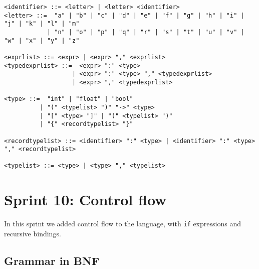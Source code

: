 \begin{verbatim}
<identifier> ::= <letter> | <letter> <identifier>
<letter> ::=  "a" | "b" | "c" | "d" | "e" | "f" | "g" | "h" | "i" | "j" | "k" | "l" | "m" 
            | "n" | "o" | "p" | "q" | "r" | "s" | "t" | "u" | "v" | "w" | "x" | "y" | "z"

<exprlist> ::= <expr> | <expr> "," <exprlist>
<typedexprlist> ::=  <expr> ":" <type> 
                   | <expr> ":" <type> "," <typedexprlist>
                   | <expr> "," <typedexprlist>
    
<type> ::=  "int" | "float" | "bool" 
          | "(" <typelist> ")" "->" <type> 
          | "[" <type> "]" | "(" <typelist> ")"
          | "{" <recordtypelist> "}"
          
<recordtypelist> ::= <identifier> ":" <type> | <identifier> ":" <type> "," <recordtypelist>

<typelist> ::= <type> | <type> "," <typelist>
\end{verbatim}

\section{Sprint 10: Control flow}\label{sec:control-flow}

In this sprint we added control flow to the language, with \texttt{if} expressions and recursive bindings.

\subsection{Grammar in BNF}\label{subsec:grammar-in-bnf10}

